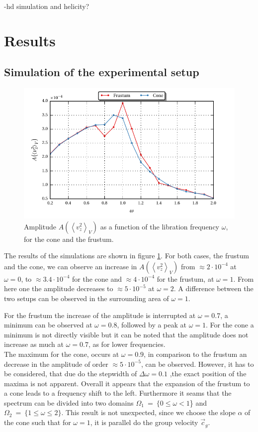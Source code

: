 -hd simulation and helicity?

\clearpage

\section{Results}
\subsection{Simulation of the experimental setup}
\label{cone:exp}

\begin{figure}[!bp]
  \centering
  \includegraphics{gfx/cone/experiment/experiment.pdf}
  \caption{Amplitude $A\left(\left<v^2_z\right>_V\right)$ as a function of the libration frequency $\omega$,
            for the cone and the frustum.  \label{fig:cone_expseries} }
\end{figure}

The results of the simulations are shown in figure \ref{fig:cone_expseries}.
For both cases, the frustum and the cone, we can observe an increase in $A\left(\left<v^2_z\right>_V\right)$
from $\approx 2\cdot10^{-4}$ at $\omega=0$, to  $\approx 3.4\cdot10^{-4}$ for the cone and $\approx 4\cdot10^{-4}$ for the frustum,  at $\omega=1$.
From here one the amplitude decreases to $\approx 5\cdot10^{-5}$ at $\omega=2$.
A difference between the two setups can be observed in the surrounding area of $\omega=1$.

For the frustum the increase of the amplitude is interrupted at $\omega=0.7$, a minimum can be observed at $\omega=0.8$, followed by
a peak at $\omega=1$. For the cone a minimum is not directly visible but it can be noted that the
amplitude does not increase as much at $\omega=0.7$, as for lower frequencies.\\
The maximum for the cone, occurs at $\omega=0.9$, in comparison to the frustum an decrease in the amplitude of order $\approx 5\cdot10^{-5}$, can be observed.
However, it has to be considered, that due do the stepwidth of $\Delta\omega = 0.1$ ,the exact position of the maxima is not apparent.
Overall it appears that the expansion of the frustum to a cone leads to a frequency shift to the left.
Furthermore it seams that the spectrum can be divided into two domains $\Omega_1~=~\{0\leq\omega<1$\} and $\Omega_2~=~\{1\leq\omega\leq2\}$.
This result is not unexpected, since we choose the slope $\alpha$ of the cone such that for $\omega=1$, it is parallel
do the group velocity $\vec{c}_{g}$.

